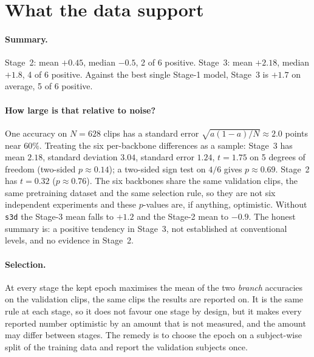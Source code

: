 \documentclass[11pt,a4paper]{article}
\theoremstyle{plain}
\theoremstyle{remark}
\begin{document}
\section{What the data support}

\begin{table}[h]\centering\small

\caption{Accuracy of the plain average (Stage~1) and changes from it, in points. ``Best single'' is the better of the two Stage-1 branches.}\label{tab:delta}
\end{table}

\paragraph{Summary.} Stage~2: mean $+0.45$, median $-0.5$, 2 of 6 positive. Stage~3: mean $+2.18$, median $+1.8$, 4 of 6 positive. Against the best single Stage-1 model, Stage~3 is $+1.7$ on average, 5 of 6 positive.

\paragraph{How large is that relative to noise?} One accuracy on $N=628$ clips has a standard error $\sqrt{a(1-a)/N}\approx 2.0$ points near $60\%$. Treating the six per-backbone differences as a sample: Stage~3 has mean $2.18$, standard deviation $3.04$, standard error $1.24$, $t=1.75$ on 5 degrees of freedom (two-sided $p\approx0.14$); a two-sided sign test on $4/6$ gives $p\approx0.69$. Stage~2 has $t=0.32$ ($p\approx0.76$). The six backbones share the same validation clips, the same pretraining dataset and the same selection rule, so they are not six independent experiments and these $p$-values are, if anything, optimistic. Without \texttt{s3d} the Stage-3 mean falls to $+1.2$ and the Stage-2 mean to $-0.9$. The honest summary is: a positive tendency in Stage~3, not established at conventional levels, and no evidence in Stage~2.

\paragraph{Selection.} At every stage the kept epoch maximises the mean of the two \emph{branch} accuracies on the validation clips, the same clips the results are reported on. It is the same rule at each stage, so it does not favour one stage by design, but it makes every reported number optimistic by an amount that is not measured, and the amount may differ between stages. The remedy is to choose the epoch on a subject-wise split of the training data and report the validation subjects once.
\end{document}
